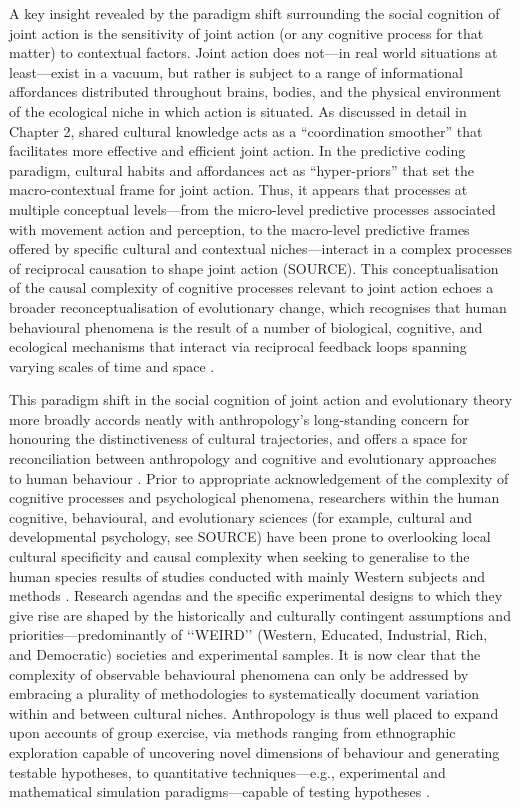 A key insight revealed by the paradigm shift surrounding the social cognition of joint action is the sensitivity of joint action (or any cognitive process for that matter) to contextual factors.  Joint action does not---in real world situations at least---exist in a vacuum, but rather is subject to a range of informational affordances distributed throughout brains, bodies, and the physical environment of the ecological niche in which action is situated.  As discussed in detail in Chapter 2, shared cultural knowledge acts as a ``coordination smoother'' \citep{Vesper2017} that facilitates more effective and efficient joint action.  In the predictive coding paradigm, cultural habits and affordances act as ``hyper-priors'' that set the macro-contextual frame for joint action\citep{Clark2013}.  Thus, it appears that processes at multiple conceptual levels---from the micro-level predictive processes associated with movement action and perception, to the macro-level predictive frames offered by specific cultural and contextual niches---interact in a complex processes of reciprocal causation to shape joint action (SOURCE).  This conceptualisation of the causal complexity of cognitive processes relevant to joint action echoes a broader reconceptualisation of evolutionary change, which recognises that human behavioural phenomena is the result of a number of biological, cognitive, and ecological mechanisms that interact via reciprocal feedback loops spanning varying scales of time and space \citep{Fuentes2015}.


This paradigm shift in the social cognition of joint action and evolutionary theory more broadly accords neatly with anthropology's long-standing concern for honouring the distinctiveness of cultural trajectories, and offers a space for reconciliation between anthropology and cognitive and evolutionary approaches to human behaviour \citep{Whitehouse2012}.  Prior to appropriate acknowledgement of the complexity of cognitive processes and psychological phenomena, researchers within the human cognitive, behavioural, and evolutionary sciences (for example, cultural and developmental psychology, see SOURCE) have been prone to overlooking local cultural specificity and causal complexity when seeking to generalise to the human species results of studies conducted with mainly Western subjects and methods \citep{Henrich2010d}.  Research agendas and the specific experimental designs to which they give rise are shaped by the historically and culturally contingent assumptions and priorities---predominantly of ‘‘WEIRD’’ (Western, Educated, Industrial, Rich, and Democratic) societies and experimental samples.  It is now clear that the complexity of observable behavioural phenomena can only be addressed by embracing a plurality of methodologies to systematically document variation within and between cultural niches.  Anthropology is thus well placed to expand upon accounts of group exercise, via methods ranging from ethnographic exploration capable of uncovering novel dimensions of behaviour and generating testable hypotheses, to quantitative techniques---e.g., experimental and mathematical simulation paradigms---capable of testing hypotheses \citep{Epstein2006,Fuentes2016}.

